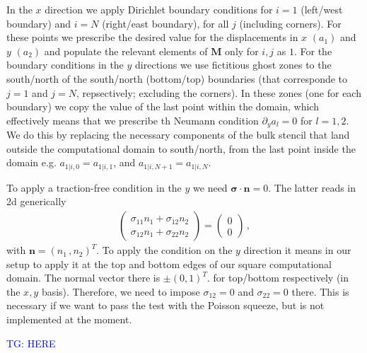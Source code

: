 \documentclass[11pt,a4paper]{article}
\newcommand{\p}{\partial}
\newcommand{\tg}[1]{\textcolor{blue}{TG: #1} }
\newcommand{\bb}[1]{\boldsymbol{#1}}
\begin{document}
In the $x$ direction we apply Dirichlet boundary conditions for $i=1$ (left/west boundary)  and $i=N$ (right/east boundary), for all $j$ (including corners). For these points we prescribe the desired value for the displacements in $x$ $(a_1)$ and $y$ $(a_2)$ and populate the relevant elements of $\mathbf{M}$ only for $i,j$ as $1$. For the boundary conditions in the $y$ directions we use fictitious ghost zones to the south/north of the south/north (bottom/top) boundaries (that corresponde to $j=1$ and $j=N$, repsectively; excluding the corners). In these zones (one for each boundary) we copy the value of the last point within the domain, which effectively means that we prescribe th Neumann condition $\p_y a_l = 0$ for $l=1,2$. We do this by replacing the necessary components of the bulk stencil that land outside the computational domain to south/north, from the last point inside the domain e.g. $a_{1|i,0} = a_{1|i,1}$, and $a_{1|i,N+1} = a_{1|i,N}$.  

To apply a traction-free condition in the $y$ we need $\bb{\sigma} \cdot \bb{n} = 0 $. The latter reads in 2d generically
\begin{align*}
    \begin{pmatrix}
        \sigma_{11} n_1 + \sigma_{12} n_2
        \\
        \sigma_{12} n_1 + \sigma_{22} n_2
    \end{pmatrix}
    = 
    \begin{pmatrix}
        0 \\ 0
    \end{pmatrix}
    \,,
\end{align*}
with $\bb{n} = (n_1\,, n_2)^T$. To apply the condition on the $y$ direction it means in our setup to apply it at the top and bottom edges of our square computational domain. The normal vector there is $\pm (0,1)^T$. for top/bottom respectively (in the $x,y$ basis). Therefore, we need to impose $\sigma_{12} = 0$ and $\sigma_{22}=0$ there. This is necessary if we want to pass the test with the Poisson squeeze, but is not implemented at the moment.

\tg{HERE}
\end{document}
